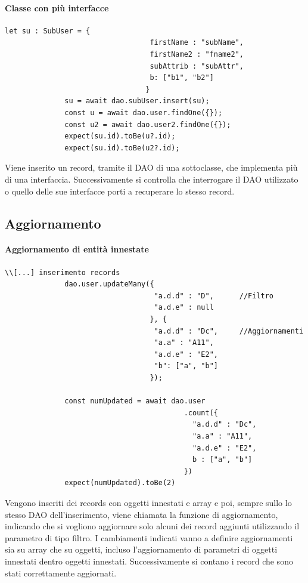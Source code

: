 \documentclass[a4paper, 12pt]{report}
\begin{document}
          \paragraph{Classe con più interfacce}
            \begin{Verbatim}[samepage=true]
              let su : SubUser = {
                                  firstName : "subName",
                                  firstName2 : "fname2",
                                  subAttrib : "subAttr",
                                  b: ["b1", "b2"]
                                 }
              su = await dao.subUser.insert(su);
              const u = await dao.user.findOne({});
              const u2 = await dao.user2.findOne({});
              expect(su.id).toBe(u?.id);
              expect(su.id).toBe(u2?.id);
            \end{Verbatim}
            Viene inserito un record, tramite il DAO di una sottoclasse, che implementa più di una interfaccia. Successivamente si controlla che interrogare il DAO utilizzato o quello delle sue interfacce porti a recuperare lo stesso record.
        \subsection{Aggiornamento}
          \paragraph{Aggiornamento di entità innestate}
            \begin{Verbatim}[samepage=true]
              \\[...] inserimento records
              dao.user.updateMany({
                                   "a.d.d" : "D",      //Filtro
                                   "a.d.e" : null
                                  }, {
                                   "a.d.d" : "Dc",     //Aggiornamenti
                                   "a.a" : "A11",
                                   "a.d.e" : "E2",
                                   "b": ["a", "b"]
                                  });

              const numUpdated = await dao.user
                                          .count({
                                            "a.d.d" : "Dc",
                                            "a.a" : "A11",
                                            "a.d.e" : "E2",
                                            b : ["a", "b"]
                                          })
              expect(numUpdated).toBe(2)
            \end{Verbatim}
            Vengono inseriti dei records con oggetti innestati e array e poi, sempre sullo lo stesso DAO dell'inserimento, viene chiamata la funzione di aggiornamento, indicando che si vogliono aggiornare solo alcuni dei record aggiunti utilizzando il parametro di tipo filtro.
            I cambiamenti indicati vanno a definire aggiornamenti sia su array che su oggetti, incluso l'aggiornamento di parametri di oggetti innestati dentro oggetti innestati.
            Successivamente si contano i record che sono stati correttamente aggiornati.
\end{document}
